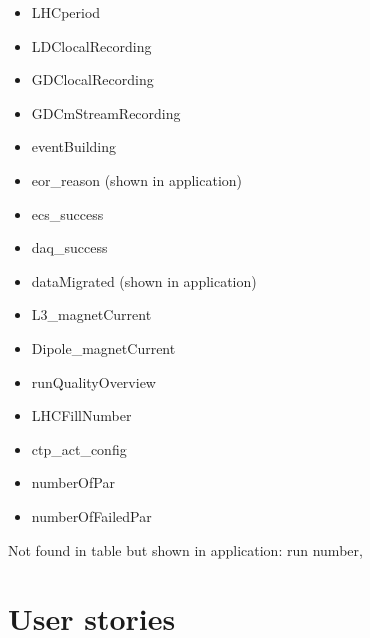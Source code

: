 \documentclass[a4paper,11pt]{book}
\begin{document}
\begin{itemize}
  \item LHCperiod	
  \item LDClocalRecording	
  \item GDClocalRecording	
  \item GDCmStreamRecording	
  \item eventBuilding	
  \item eor\_reason (shown in application)
  \item ecs\_success	
  \item daq\_success	
  \item dataMigrated (shown in application)
  \item L3\_magnetCurrent	
  \item Dipole\_magnetCurrent	
  \item runQualityOverview	
  \item LHCFillNumber	
  \item ctp\_act\_config	
  \item numberOfPar	
  \item numberOfFailedPar
\end{itemize}
Not found in table but shown in application: run number, 

\section{User stories}
\end{document}
